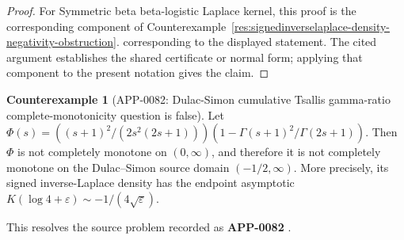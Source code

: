 \documentclass[11pt]{article}
\numberwithin{equation}{section}
\theoremstyle{definition}
\newtheorem{counterexample}[theorem]{Counterexample}
\theoremstyle{remark}
\newcommand{\1}{\mathbf 1}
\begin{document}
\begin{proof}
For Symmetric beta beta-logistic Laplace kernel, this proof is the corresponding component of Counterexample~\ref{res:signedinverselaplace-density-negativity-obstruction}.  corresponding to the displayed statement.  The cited argument establishes the shared certificate or normal form; applying that component to the present notation gives the claim.
\end{proof}

\begin{counterexample}[APP-0082: Dulac-Simon cumulative Tsallis gamma-ratio complete-monotonicity question is false]
\label{res:dulacsimon-tsallisgammaratio-notcm}
Let \(\Phi(s)=((s+1)^2/(2s^2(2s+1)))(1-\Gamma(s+1)^2/\Gamma(2s+1))\). Then \(\Phi\) is not completely monotone on \((0,\infty)\), and therefore it is not completely monotone on the Dulac--Simon source domain \((-1/2,\infty)\). More precisely, its signed inverse-Laplace density has the endpoint asymptotic \(K(\log4+\varepsilon)\sim -1/(4\sqrt{\varepsilon})\).



This resolves the source problem recorded as \textbf{APP-0082} \cite{app-app-0082-source}.
\end{counterexample}
\end{document}
